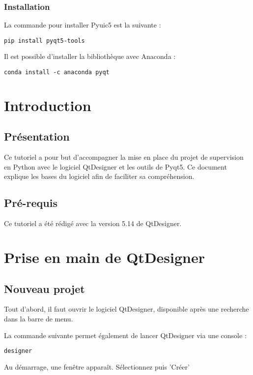 {\subsection{Installation}

La commande pour installer Pyuic5 est la suivante : \newline

\begin{lstlisting}
pip install pyqt5-tools
\end{lstlisting}
Il est possible d'installer la bibliothèque avec Anaconda : \newline
\begin{lstlisting}
conda install -c anaconda pyqt
\end{lstlisting}\chapter{Introduction}

\section{Présentation}

Ce tutoriel a pour but d'accompagner la mise en place du projet de supervision en Python avec le logiciel QtDesigner et les outils de Pyqt5. Ce document explique les bases du logiciel afin de faciliter sa compréhension.

\section{Pré-requis}

Ce tutoriel a été rédigé avec la version 5.14 de QtDesigner. \newline

\chapter{Prise en main de QtDesigner}

\section{Nouveau projet}

Tout d'abord, il faut ouvrir le logiciel QtDesigner, disponible après une recherche dans la barre de menu.


La commande suivante permet également de lancer QtDesigner via une console : 
\begin{lstlisting}
designer
\end{lstlisting}
Au démarrage, une fenêtre apparaît. Sélectionnez  puis 'Créer'

}
